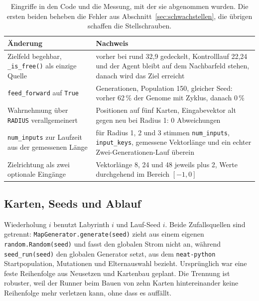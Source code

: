 \documentclass[sigconf]{acmart}
\begin{document}
\begin{table}[t]
  \caption{Eingriffe in den Code und die Messung, mit der sie abgenommen wurden. Die ersten beiden beheben die Fehler aus Abschnitt~\ref{sec:schwachstellen}, die übrigen schaffen die Stellschrauben.}
  \label{tab:aenderungen}
  \small
  \renewcommand{\arraystretch}{1.25}
  \begin{tabular}{@{}>{\raggedright\arraybackslash}p{}>{\raggedright\arraybackslash}p{}@{}}
    \toprule
    Änderung & Nachweis \\
    \midrule
    Zielfeld begehbar, \texttt{\_is\_free()} als einzige Quelle
      & vorher bei rund 32,9 gedeckelt, Kontrolllauf 22,24 und der Agent bleibt auf dem Nachbarfeld stehen, danach wird das Ziel erreicht \\
    \texttt{feed\_forward} auf \texttt{True}
      & 30 Generationen, Population 150, gleicher Seed: vorher 62\,\% der Genome mit Zyklus, danach 0\,\% \\
    Wahrnehmung über \texttt{RADIUS} verallgemeinert
      & 3125 Positionen auf fünf Karten, Eingabevektor alt gegen neu bei Radius 1: 0 Abweichungen \\
    \texttt{num\_inputs} zur Laufzeit aus der gemessenen Länge
      & für Radius 1, 2 und 3 stimmen \texttt{num\_inputs}, \texttt{input\_keys}, gemessene Vektorlänge und ein echter Zwei-Generationen-Lauf überein \\
    Zielrichtung als zwei optionale Eingänge
      & Vektorlänge 8, 24 und 48 jeweils plus 2, Werte durchgehend im Bereich $[-1,0]$ \\
    \bottomrule
  \end{tabular}
\end{table}

\subsection{Karten, Seeds und Ablauf}
Wiederholung $i$ benutzt Labyrinth $i$ und Lauf-Seed $i$. Beide Zufallsquellen sind getrennt: \texttt{MapGenerator.generate(seed)} zieht aus einem eigenen \texttt{random.Random(seed)} und fasst den globalen Strom nicht an, während \texttt{seed\_run(seed)} den globalen Generator setzt, aus dem \texttt{neat-python} Startpopulation, Mutationen und Elternauswahl bezieht. Ursprünglich war eine feste Reihenfolge aus Neusetzen und Kartenbau geplant. Die Trennung ist robuster, weil der Runner beim Bauen von zehn Karten hintereinander keine Reihenfolge mehr verletzen kann, ohne dass es auffällt.
\end{document}

